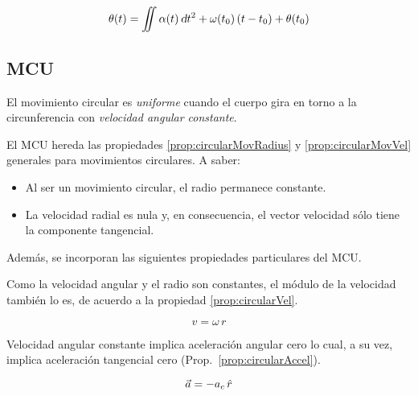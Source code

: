 \begin{mdframed}[style=DefinitionFrame]
    \begin{defn}
        \label{defn:anglePosition}
    \end{defn}
    \begin{equation*}
        \theta(t) = \iint \alpha(t) \, \textsl{d} t^2 + \omega (t_0) \left(t-t_0\right) + \theta(t_0)
    \end{equation*}
\end{mdframed}


\subsection{MCU}
El movimiento circular es \emph{uniforme} cuando el cuerpo gira en torno a la circunferencia con \emph{velocidad angular constante}.

El MCU hereda las propiedades \ref{prop:circularMovRadius} y \ref{prop:circularMovVel} generales para movimientos circulares.
A saber:
\begin{itemize}
    \item Al ser un movimiento circular, el radio permanece constante.
    
    \item La velocidad radial es nula y, en consecuencia, el vector velocidad sólo tiene la componente tangencial.
\end{itemize}

Además, se incorporan las siguientes propiedades particulares del MCU.

Como la velocidad angular y el radio son constantes, el módulo de la velocidad también lo es, de acuerdo a la propiedad \ref{prop:circularVel}.

\begin{mdframed}[style=PropertyFrame]
    \begin{prop}
    \end{prop}
    \begin{equation*}
        v = \omega \, r
    \end{equation*}
\end{mdframed}

Velocidad angular constante implica aceleración angular cero lo cual, a su vez, implica aceleración tangencial cero (Prop.~\ref{prop:circularAccel}).

\begin{mdframed}[style=PropertyFrame]
    \begin{prop}
    \end{prop}
    \begin{equation*}
        \Vec{a} = - a_c \, \hat{r}
    \end{equation*}
\end{mdframed}

